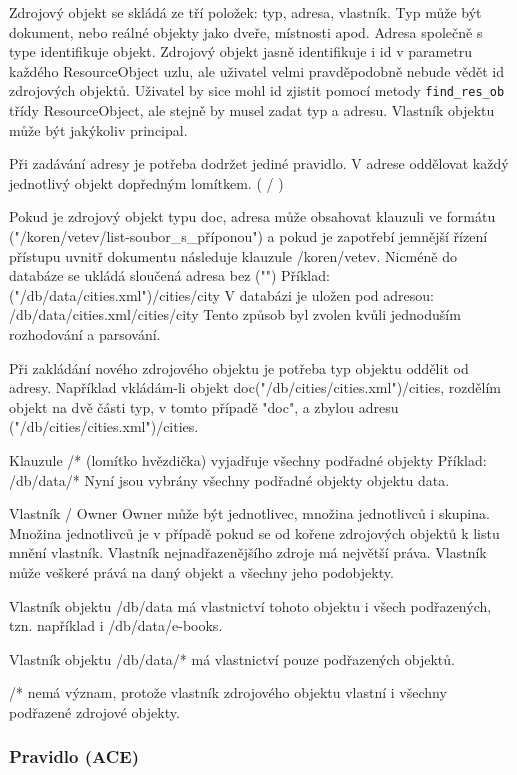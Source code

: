 Zdrojový objekt se skládá ze tří položek: typ, adresa, vlastník. Typ může být dokument, nebo reálné objekty jako dveře, místnosti apod. Adresa společně s type identifikuje objekt. Zdrojový objekt jasně identifikuje i id v parametru každého ResourceObject uzlu, ale uživatel velmi pravděpodobně nebude vědět id zdrojových objektů. Uživatel by sice mohl id zjistit pomocí metody \verb|find_res_ob| třídy ResourceObject, ale stejně by musel zadat typ a adresu. Vlastník objektu může být jakýkoliv principal.



Při zadávání adresy je potřeba dodržet jediné pravidlo. V adrese oddělovat každý jednotlivý objekt dopředným lomítkem. ( / )

Pokud je zdrojový objekt typu doc, adresa může obsahovat klauzuli ve formátu ("/koren/vetev/list-soubor\_s\_příponou") a pokud je zapotřebí jemnější řízení přístupu uvnitř dokumentu následuje klauzule /koren/vetev. Nicméně do databáze se ukládá sloučená adresa bez ("")
Příklad:  ("/db/data/cities.xml")/cities/city
V databázi je uložen pod adresou: /db/data/cities.xml/cities/city
Tento způsob byl zvolen kvůli jednoduším rozhodování a parsování.

Při zakládání nového zdrojového objektu je potřeba typ objektu oddělit od adresy. Například vkládám-li objekt doc("/db/cities/cities.xml")/cities, rozdělím objekt na dvě části  typ, v tomto případě "doc", a zbylou adresu ("/db/cities/cities.xml")/cities.

Klauzule /* (lomítko hvězdička) vyjadřuje všechny podřadné objekty
Příklad:  /db/data/*
Nyní jsou vybrány všechny podřadné objekty objektu data.


Vlastník / Owner
Owner může být jednotlivec, množina jednotlivců i skupina.
Množina jednotlivců je v případě pokud se od kořene zdrojových objektů k listu mnění vlastník. Vlastník nejnadřazenějšího zdroje má největší práva. Vlastník může veškeré prává na daný objekt a všechny jeho podobjekty.

Vlastník objektu  /db/data má vlastnictví tohoto objektu i všech podřazených, tzn. například i /db/data/e-books.

Vlastník objektu  /db/data/* má vlastnictví pouze podřazených objektů.

/* nemá význam, protože vlastník zdrojového objektu vlastní i všechny podřazené zdrojové objekty.

\subsubsection{Pravidlo (ACE)}

